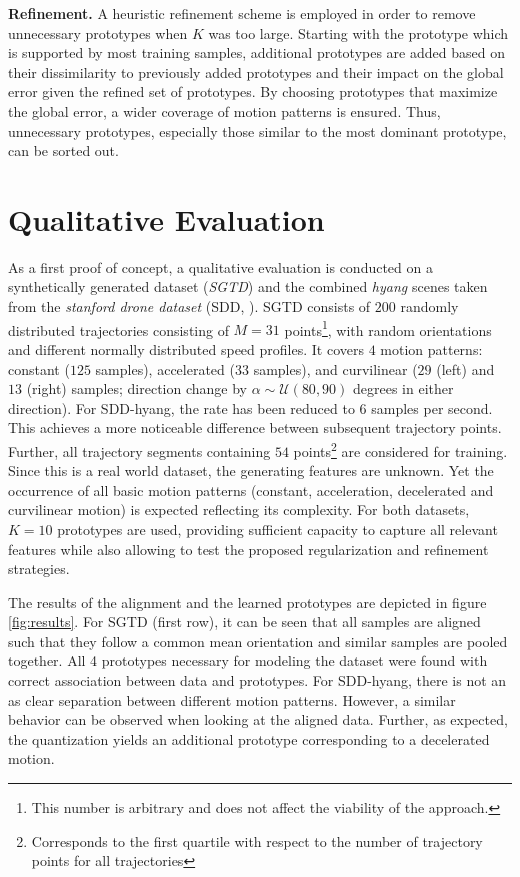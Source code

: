 \documentclass[letterpaper, 10 pt, conference]{ieeeconf}  %
\begin{document}
\textbf{Refinement.} A heuristic refinement scheme is employed in order to remove unnecessary prototypes when $K$ was too large.
Starting with the prototype which is supported by most training samples, additional prototypes are added based on their dissimilarity to previously added prototypes and their impact on the global error given the refined set of prototypes. %
By choosing prototypes that maximize the global error, a wider coverage of motion patterns is ensured.
Thus, unnecessary prototypes, especially those similar to the most dominant prototype, can be sorted out.

\section{Qualitative Evaluation}
\label{sec:eval}
As a first proof of concept, a qualitative evaluation is conducted on a synthetically generated dataset (\emph{SGTD}) and the combined \emph{hyang} scenes \cite{hug2017reliability} taken from the \emph{stanford drone dataset} (SDD, \cite{robicquet2016learning}).
SGTD consists of $200$ randomly distributed trajectories consisting of $M=31$ points\footnote{This number is arbitrary and does not affect the viability of the approach.}, with random orientations and different normally distributed speed profiles. 
It covers $4$ motion patterns: constant ($125$ samples), accelerated ($33$ samples), and curvilinear ($29$ (left) and $13$ (right) samples; direction change by $\alpha \sim \mathcal{U}(80, 90)$ degrees in either direction).
For SDD-hyang, the rate has been reduced to 6 samples per second.
This achieves a more noticeable difference between subsequent trajectory points.
Further, all trajectory segments containing $54$ points\footnote{Corresponds to the first quartile with respect to the number of trajectory points for all trajectories} are considered for training. 
Since this is a real world dataset, the generating features are unknown.
Yet the occurrence of all basic motion patterns (constant, acceleration, decelerated and curvilinear motion) is expected reflecting its complexity. 
For both datasets, $K=10$ prototypes are used, providing sufficient capacity to capture all relevant features while also allowing to test the proposed regularization and refinement strategies.

The results of the alignment and the learned prototypes are depicted in figure \ref{fig:results}.
For SGTD (first row), it can be seen that all samples are aligned such that they follow a common mean orientation and similar samples are pooled together.
All 4 prototypes necessary for modeling the dataset were found with correct association between data and prototypes.
For SDD-hyang, there is not an as clear separation between different motion patterns. 
However, a similar behavior can be observed when looking at the aligned data.
Further, as expected, the quantization yields an additional prototype corresponding to a decelerated motion.
\end{document}
